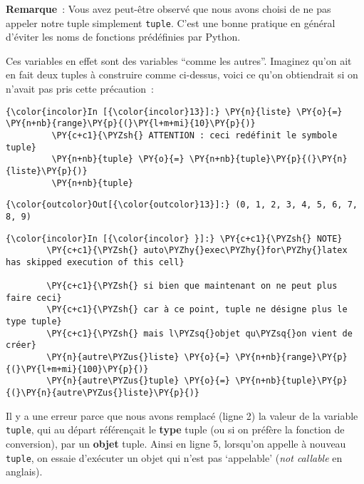     \textbf{Remarque}~: Vous avez peut-être observé que nous avons choisi de
ne pas appeler notre tuple simplement \texttt{tuple}. C'est une bonne
pratique en général d'éviter les noms de fonctions prédéfinies par
Python.

Ces variables en effet sont des variables ``comme les autres''. Imaginez
qu'on ait en fait deux tuples à construire comme ci-dessus, voici ce
qu'on obtiendrait si on n'avait pas pris cette précaution~:

    \begin{Verbatim}[commandchars=\\\{\},frame=single,framerule=0.3mm,rulecolor=\color{cellframecolor}]
{\color{incolor}In [{\color{incolor}13}]:} \PY{n}{liste} \PY{o}{=} \PY{n+nb}{range}\PY{p}{(}\PY{l+m+mi}{10}\PY{p}{)}
         \PY{c+c1}{\PYZsh{} ATTENTION : ceci redéfinit le symbole tuple}
         \PY{n+nb}{tuple} \PY{o}{=} \PY{n+nb}{tuple}\PY{p}{(}\PY{n}{liste}\PY{p}{)}
         \PY{n+nb}{tuple}
\end{Verbatim}


\begin{Verbatim}[commandchars=\\\{\},frame=single,framerule=0.3mm,rulecolor=\color{cellframecolor}]
{\color{outcolor}Out[{\color{outcolor}13}]:} (0, 1, 2, 3, 4, 5, 6, 7, 8, 9)
\end{Verbatim}
            
    \begin{Verbatim}[commandchars=\\\{\},frame=single,framerule=0.3mm,rulecolor=\color{cellframecolor}]
{\color{incolor}In [{\color{incolor} }]:} \PY{c+c1}{\PYZsh{} NOTE}
        \PY{c+c1}{\PYZsh{} auto\PYZhy{}exec\PYZhy{}for\PYZhy{}latex has skipped execution of this cell}
        
        \PY{c+c1}{\PYZsh{} si bien que maintenant on ne peut plus faire ceci}
        \PY{c+c1}{\PYZsh{} car à ce point, tuple ne désigne plus le type tuple}
        \PY{c+c1}{\PYZsh{} mais l\PYZsq{}objet qu\PYZsq{}on vient de créer}
        \PY{n}{autre\PYZus{}liste} \PY{o}{=} \PY{n+nb}{range}\PY{p}{(}\PY{l+m+mi}{100}\PY{p}{)}
        \PY{n}{autre\PYZus{}tuple} \PY{o}{=} \PY{n+nb}{tuple}\PY{p}{(}\PY{n}{autre\PYZus{}liste}\PY{p}{)}
\end{Verbatim}


    Il y a une erreur parce que nous avons remplacé (ligne 2) la valeur de
la variable \texttt{tuple}, qui au départ référençait le \textbf{type}
tuple (ou si on préfère la fonction de conversion), par un
\textbf{objet} tuple. Ainsi en ligne 5, lorsqu'on appelle à nouveau
\texttt{tuple}, on essaie d'exécuter un objet qui n'est pas `appelable'
(\emph{not callable} en anglais).

